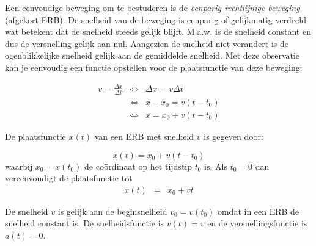 \documentclass{ximera}
\begin{document}
	\author{Bart Lambregs}
    \xmsource\xmuitleg




Een eenvoudige beweging om te bestuderen is de \emph{eenparig rechtlijnige beweging} (afgekort ERB). De snelheid van de beweging is eenparig of gelijkmatig verdeeld wat betekent dat de snelheid steeds gelijk blijft. M.a.w. is de snelheid constant en dus de versnelling gelijk aan nul. Aangezien de snelheid niet verandert is de ogenblikkelijke snelheid gelijk aan de gemiddelde snelheid. Met deze observatie kan je eenvoudig een functie opstellen voor de plaatsfunctie van deze beweging:

\[
\begin{array}{rcl}

v=\frac{\Delta x}{\Delta t} & \Leftrightarrow & \Delta x=v\Delta t \\
&\Leftrightarrow & x-x_0=v(t-t_0) \\
&\Leftrightarrow & x=x_0+v(t-t_0)

\end{array}
\]

\begin{theorem}
De plaatsfunctie $x(t)$ van een ERB met snelheid $v$ is gegeven door:

\[
x(t)=x_0+v(t-t_0)
\]
waarbij $x_0=x(t_0)$ de coördinaat op het tijdstip $t_0$ is. Als $t_0=0$ dan vereenvoudigt de plaatsfunctie tot
\begin{eqnarray}%
x(t)&=&x_0+vt
\end{eqnarray}

\end{theorem}

De snelheid $v$ is gelijk aan de beginsnelheid $v_0=v(t_0)$ omdat in een ERB de snelheid constant is. De snelheidsfunctie is $v(t)=v$ en de versnellingsfunctie is $a(t)=0$.
\end{document}

